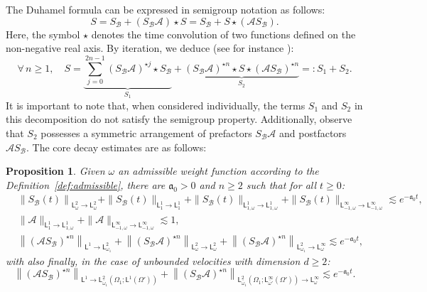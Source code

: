 \documentclass[11pt]{amsart}
\newtheorem{proposition}[theorem]{Proposition}
\theoremstyle{definition}
\theoremstyle{remark}
\numberwithin{equation}{section}
\def\AA{{\mathcal A}}
\newcommand{\sfL}{\mathsf{L}}
\begin{document}
The Duhamel formula can be expressed in semigroup notation as follows:
\begin{equation*}
  S =  S_{\mathcal B} + (S_{\mathcal B}\mathcal A) \star S =  S_{\mathcal B} + S \star (\mathcal A  S_{\mathcal B}).
\end{equation*}
Here, the symbol $\star$ denotes the time convolution of two functions defined on the non-negative real axis. By iteration, we deduce (see for instance \cite[(1.28)]{MR4265692}):
\begin{equation}
  \label{eq:decompo}
  \forall \, n \ge 1, \quad S = \underbrace{\sum_{j=0}^{2n-1} (S_{\mathcal B} \mathcal A)^{\star j} \star S_{\mathcal B}}_{S_1} + \underbrace{(S_{\mathcal B} \mathcal A)^{\star n} \star S \star (\mathcal A S_{\mathcal B})^{\star n}}_{S_2} =: S_1 + S_2.
\end{equation}
It is important to note that, when considered individually, the terms $S_1$ and $S_2$ in this decomposition do not satisfy the semigroup property. Additionally, observe that $S_2$ possesses a symmetric arrangement of prefactors $S_{\mathcal B} \mathcal A$ and postfactors $\mathcal A S_{\mathcal B}$. The core decay estimates are as follows:
\begin{proposition}
  \label{prop:estSB}
  Given $\omega$ an admissible weight function according to the Definition~\ref{def:admissible},  there are $\mathfrak{a}_0>0$  and $n \ge 2$ such that for all $t \ge 0$:
  \begin{align}
    \label{eq:dec-B}
    & \left\|  S_{\mathcal B}(t) \right\|_{\sfL^{2}_{\omega} \to \sfL^2_{\omega}}  + \| S_{\mathcal B}(t) \|_{\sfL^{1}_{1} \to \sfL^{1}_{1}} + \| S_{\mathcal B}(t) \|_{\sfL^{1}_{1,\omega} \to \sfL^{1}_{1,\omega}} + \| S_{\mathcal B}(t) \|_{\sfL^{\infty}_{-1,\omega} \to \sfL^{\infty}_{-1,\omega}} \lesssim  e^{-\mathfrak{a}_0t}, \\
    \label{eq:dec-A}
    & \| \AA \|_{\sfL^{1}_{1} \to \sfL^{1}_{1,\omega}} + \| \AA \|_{\sfL^{\infty}_{-1,\omega} \to \sfL^{\infty}_{-1,\omega}} \lesssim 1, \\
    \label{eq:dec-iterated-gal}
    & \left\| (\AA S_{\mathcal B}  )^{\star n} \right\|_{\sfL^{1} \to \sfL^{2}_{\omega_1}} +
      \left\| (S_{\mathcal B} \mathcal A)^{\star n} \right\|_{\sfL^{2}_{\omega} \to \sfL^2_{\omega}} + \left\| (S_{\mathcal B} \mathcal A)^{\star n}\right\|_{ \sfL^{2}_{\omega_1} \to \sfL^{\infty}_{\omega}} \lesssim e^{- \mathfrak{a}_0 t},
  \end{align}
  with also finally, in the case of unbounded velocities with dimension $d \ge 2$:
  \begin{equation}
    \label{eq:dec-iterated-gal-1DprimeBIS}
      \left\| (\AA S_{\mathcal B}  )^{\star n} \right\|_{\sfL^{1}  \to \sfL^{2}_{\bar \omega_1}(\Omega_1 ; \sfL^{1}(\Omega'))}  + \left\| (S_{\mathcal B} \mathcal A)^{\star n} \right\|_{\sfL^{2}_{\bar \omega_1}(\Omega_1;\sfL^{\infty}_{\bar\omega'}(\Omega')) \to \sfL^{\infty}_{\omega}} \lesssim e^{- \mathfrak{a}_0 t}.
  \end{equation}
\end{proposition}
\end{document}
